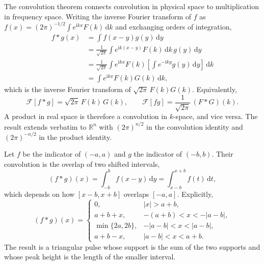 The convolution theorem connects convolution in physical space to multiplication in frequency space. Writing the inverse Fourier transform of $f$ as $f(x)=(2\pi)^{-1/2}\int e^{\mathrm{i}kx}F(k)\,\mathrm{d}k$ and exchanging orders of integration,
\begin{align}
f*g(x)&=\int f(x-y)g(y)\,\mathrm{d}y\\
&=\frac{1}{\sqrt{2\pi}}\int e^{\mathrm{i}k(x-y)}F(k)\,\mathrm{d}k\,g(y)\,\mathrm{d}y\\
&=\frac{1}{\sqrt{2\pi}}\int e^{\mathrm{i}kx}F(k)\!\left[\int e^{-\mathrm{i}ky}g(y)\,\mathrm{d}y\right]\,\mathrm{d}k\\
&=\int e^{\mathrm{i}kx}F(k)G(k)\,\mathrm{d}k,
\end{align}
which is the inverse Fourier transform of $\sqrt{2\pi}\,F(k)G(k)$. Equivalently,
\begin{equation}
\mathcal{F}[f*g]=\sqrt{2\pi}\,F(k)\,G(k),
\qquad
\mathcal{F}[fg]=\frac{1}{\sqrt{2\pi}}\,(F*G)(k).
\end{equation}
A product in real space is therefore a convolution in $k$-space, and vice versa. The result extends verbatim to $\mathbb{R}^n$ with $(2\pi)^{n/2}$ in the convolution identity and $(2\pi)^{-n/2}$ in the product identity.

\begin{example}
Let $f$ be the indicator of $(-a,a)$ and $g$ the indicator of $(-b,b)$. Their convolution is the overlap of two shifted intervals,
\begin{equation}
(f*g)(x)=\int_{-b}^{b}f(x-y)\,\mathrm{d}y=\int_{x-b}^{x+b}f(t)\,\mathrm{d}t,
\end{equation}
which depends on how $[x-b,x+b]$ overlaps $[-a,a]$. Explicitly,
\begin{equation}
(f*g)(x)=
\begin{cases}
0,&|x|>a+b,\\
a+b+x,&-(a+b)<x<-|a-b|,\\
\min\{2a,2b\},&-|a-b|<x<|a-b|,\\
a+b-x,&|a-b|<x<a+b.
\end{cases}
\end{equation}
The result is a triangular pulse whose support is the sum of the two supports and whose peak height is the length of the smaller interval.
\end{example}

